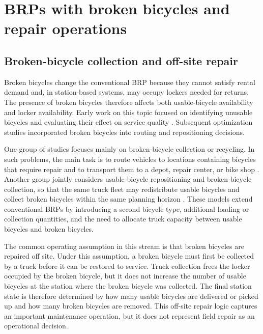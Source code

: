 \section{BRPs with broken bicycles and repair operations}

\subsection{Broken-bicycle collection and off-site repair}

Broken bicycles change the conventional BRP because they cannot satisfy rental demand and, in station-based systems, may occupy lockers needed for returns. The presence of broken bicycles therefore affects both usable-bicycle availability and locker availability. Early work on this topic focused on identifying unusable bicycles and evaluating their effect on service quality \citep{kaspiDetectionUnusableBicycles2016,kaspiBikesharingSystemsUser2017}. Subsequent optimization studies incorporated broken bicycles into routing and repositioning decisions.

One group of studies focuses mainly on broken-bicycle collection or recycling. In such problems, the main task is to route vehicles to locations containing bicycles that require repair and to transport them to a depot, repair center, or bike shop \citep{luBrokenBikeRecycling2019,zhangBikeSharingStaticRebalancing2018}. Another group jointly considers usable-bicycle repositioning and broken-bicycle collection, so that the same truck fleet may redistribute usable bicycles and collect broken bicycles within the same planning horizon \citep{alvarez-valdesOptimizingLevelService2016,wangStaticGreenRepositioning2018,wangEnhancedArtificialBee2021,duStaticRebalancingOptimization2020,zhangAdaptiveTabuSearch2020,caiDynamicBicycleRelocation2022}. These models extend conventional BRPs by introducing a second bicycle type, additional loading or collection quantities, and the need to allocate truck capacity between usable bicycles and broken bicycles.

The common operating assumption in this stream is that broken bicycles are repaired off site. Under this assumption, a broken bicycle must first be collected by a truck before it can be restored to service. Truck collection frees the locker occupied by the broken bicycle, but it does not increase the number of usable bicycles at the station where the broken bicycle was collected. The final station state is therefore determined by how many usable bicycles are delivered or picked up and how many broken bicycles are removed. This off-site repair logic captures an important maintenance operation, but it does not represent field repair as an operational decision.

